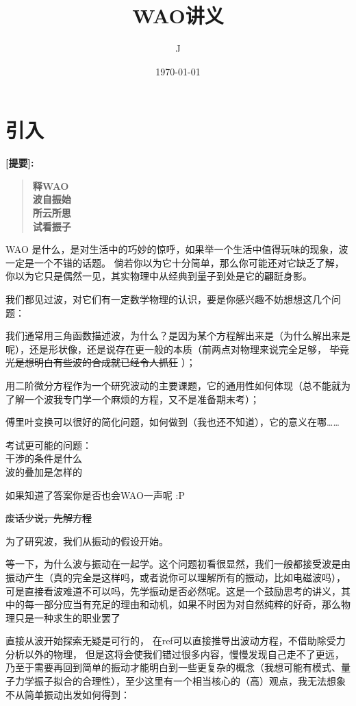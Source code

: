 \documentclass[11pt]{book}
\author{J}
\date{\today}
\title{WAO讲义}
\begin{document}
\maketitle
\tableofcontents


\part{引入}
\label{sec:orge62abb5}
\textbf{[提要]:}
\begin{verse}
\textbf{释WAO}\\[0pt]
\textbf{波自振始}\\[0pt]
\textbf{所云所思\\[0pt]
试看振子}\\[0pt]
\end{verse}

WAO 是什么，是对生活中的巧妙的惊呼，如果举一个生活中值得玩味的现象，波一定是一个不错的话题。
倘若你以为它十分简单，那么你可能还对它缺乏了解，你以为它只是偶然一见，其实物理中从经典到量子到处是它的翩跹身影。

我们都见过波，对它们有一定数学物理的认识，要是你感兴趣不妨想想这几个问题：

我们通常用三角函数描述波，为什么？是因为某个方程解出来是（为什么解出来是呢），还是形状像，还是说存在更一般的本质（前两点对物理来说完全足够， \sout{毕竟光是想明白有些波的合成就已经令人抓狂} ）；

用二阶微分方程作为一个研究波动的主要课题，它的通用性如何体现（总不能就为了解一个波我专门学一个麻烦的方程，又不是准备期末考）；

傅里叶变换可以很好的简化问题，如何做到（我也还不知道），它的意义在哪……

考试更可能的问题：\\[0pt]
干涉的条件是什么\\[0pt]
波的叠加是怎样的

如果知道了答案你是否也会WAO一声呢 :P

\sout{废话少说，先解方程}

为了研究波，我们从振动的假设开始。

等一下，为什么波与振动在一起学。这个问题初看很显然，我们一般都接受波是由振动产生（真的完全是这样吗，或者说你可以理解所有的振动，比如电磁波吗），可是直接看波难道不可以吗，先学振动是否必然呢。这是一个鼓励思考的讲义，其中的每一部分应当有充足的理由和动机，如果不时因为对自然纯粹的好奇，那么物理只是一种求生的职业罢了

直接从波开始探索无疑是可行的，
在ref可以直接推导出波动方程，不借助除受力分析以外的物理，
但是这将会使我们错过很多内容，慢慢发现自己走不了更远，乃至于需要再回到简单的振动才能明白到一些更复杂的概念（我想可能有模式、量子力学振子拟合的合理性），至少这里有一个相当核心的（高）观点，我无法想象不从简单振动出发如何得到：
\end{document}
